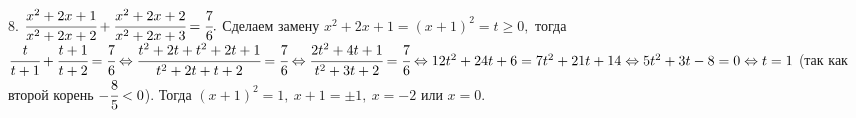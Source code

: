 8. $\cfrac{x^2+2x+1}{x^2+2x+2}+\cfrac{x^2+2x+2}{x^2+2x+3}=\cfrac{7}{6}.$ Сделаем замену $x^2+2x+1=(x+1)^2=t\geqslant0,$ тогда $\cfrac{t}{t+1}+\cfrac{t+1}{t+2}=\cfrac{7}{6}\Leftrightarrow \cfrac{t^2+2t+t^2+2t+1}{t^2+2t+t+2}=\cfrac{7}{6}\Leftrightarrow
\cfrac{2t^2+4t+1}{t^2+3t+2}=\cfrac{7}{6}\Leftrightarrow 12t^2+24t+6=7t^2+21t+14\Leftrightarrow
5t^2+3t-8=0\Leftrightarrow t=1$ (так как второй корень $-\cfrac{8}{5}<0$). Тогда $(x+1)^2=1,\ x+1=\pm1,\ x=-2$ или $x=0.$\\
